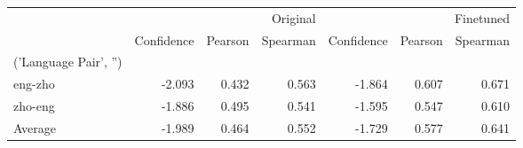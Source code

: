 \begin{tabular}{lrrrrrr}
\toprule
 & \multicolumn{3}{r}{Original} & \multicolumn{3}{r}{Finetuned} \\
 & Confidence & Pearson & Spearman & Confidence & Pearson & Spearman \\
('Language Pair', '') &  &  &  &  &  &  \\
\midrule
eng-zho & -2.093 & 0.432 & 0.563 & -1.864 & 0.607 & 0.671 \\
zho-eng & -1.886 & 0.495 & 0.541 & -1.595 & 0.547 & 0.610 \\
Average & -1.989 & 0.464 & 0.552 & -1.729 & 0.577 & 0.641 \\
\bottomrule
\end{tabular}
